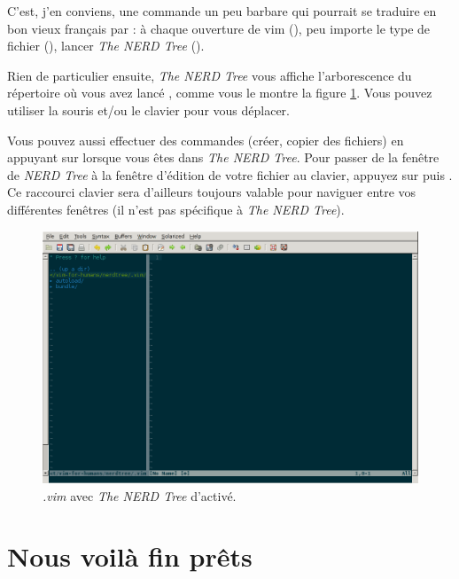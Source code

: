 C'est, j'en conviens, une commande un peu barbare qui pourrait se traduire en bon vieux français par : à chaque ouverture de vim (), peu importe le type de fichier (\hlred{\Verb|*|}), lancer \emph{The NERD Tree} ().

Rien de particulier ensuite, \emph{The NERD Tree} vous affiche l'arborescence du répertoire où vous avez lancé \vim, comme vous le montre la figure \ref{fig:vim-nerdtree}. Vous pouvez utiliser la souris et/ou le clavier pour vous déplacer. 

Vous pouvez aussi effectuer des commandes (créer, copier des fichiers) en appuyant sur \ttm\xspace lorsque vous êtes dans \emph{The NERD Tree}. Pour passer de la fenêtre de \emph{NERD Tree} à la fenêtre d'édition de votre fichier au clavier, appuyez sur  puis . Ce raccourci clavier sera d'ailleurs toujours valable pour naviguer entre vos différentes fenêtres \vim (il n'est pas spécifique à \emph{The NERD Tree}).

\begin{figure}%
  \includegraphics[width=\linewidth]{graphics/vim-nerdtree.png}
  \caption{\emph{.vim} avec \emph{The NERD Tree} d'activé.}
  \label{fig:vim-nerdtree}
\end{figure}

\section{Nous voilà fin prêts}

